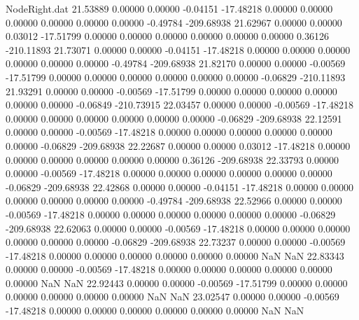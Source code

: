 \begin{filecontents}{NodeRight.dat}
  21.53889    0.00000    0.00000    -0.04151  -17.48218    0.00000    0.00000    0.00000    0.00000    0.00000    0.00000   -0.49784 -209.68938
  21.62967    0.00000    0.00000     0.03012  -17.51799    0.00000    0.00000    0.00000    0.00000    0.00000    0.00000    0.36126 -210.11893
  21.73071    0.00000    0.00000    -0.04151  -17.48218    0.00000    0.00000    0.00000    0.00000    0.00000    0.00000   -0.49784 -209.68938
  21.82170    0.00000    0.00000    -0.00569  -17.51799    0.00000    0.00000    0.00000    0.00000    0.00000    0.00000   -0.06829 -210.11893
  21.93291    0.00000    0.00000    -0.00569  -17.51799    0.00000    0.00000    0.00000    0.00000    0.00000    0.00000   -0.06849 -210.73915
  22.03457    0.00000    0.00000    -0.00569  -17.48218    0.00000    0.00000    0.00000    0.00000    0.00000    0.00000   -0.06829 -209.68938
  22.12591    0.00000    0.00000    -0.00569  -17.48218    0.00000    0.00000    0.00000    0.00000    0.00000    0.00000   -0.06829 -209.68938
  22.22687    0.00000    0.00000     0.03012  -17.48218    0.00000    0.00000    0.00000    0.00000    0.00000    0.00000    0.36126 -209.68938
  22.33793    0.00000    0.00000    -0.00569  -17.48218    0.00000    0.00000    0.00000    0.00000    0.00000    0.00000   -0.06829 -209.68938
  22.42868    0.00000    0.00000    -0.04151  -17.48218    0.00000    0.00000    0.00000    0.00000    0.00000    0.00000   -0.49784 -209.68938
  22.52966    0.00000    0.00000    -0.00569  -17.48218    0.00000    0.00000    0.00000    0.00000    0.00000    0.00000   -0.06829 -209.68938
  22.62063    0.00000    0.00000    -0.00569  -17.48218    0.00000    0.00000    0.00000    0.00000    0.00000    0.00000   -0.06829 -209.68938
  22.73237    0.00000    0.00000    -0.00569  -17.48218    0.00000    0.00000    0.00000    0.00000    0.00000    0.00000        NaN        NaN
  22.83343    0.00000    0.00000    -0.00569  -17.48218    0.00000    0.00000    0.00000    0.00000    0.00000    0.00000        NaN        NaN
  22.92443    0.00000    0.00000    -0.00569  -17.51799    0.00000    0.00000    0.00000    0.00000    0.00000    0.00000        NaN        NaN
  23.02547    0.00000    0.00000    -0.00569  -17.48218    0.00000    0.00000    0.00000    0.00000    0.00000    0.00000        NaN        NaN
\end{filecontents}

